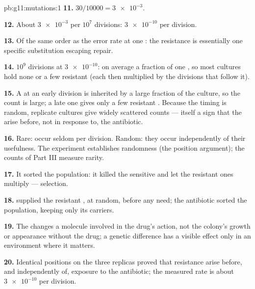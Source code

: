 \begin{solution}{pb:g11:mutations:1}
\textbf{11.} $30/\num{10000} = \num{3e-3}$.

\textbf{12.} About $\num{3e-3}$  per $10^7$ divisions:
$\num{3e-10}$ per division.

\textbf{13.} Of the same order as the error rate at one :
the resistance  is essentially one specific substitution
escaping repair.

\textbf{14.} $10^9$ divisions at $\num{3e-10}$: on average a fraction
of one , so most cultures hold none or a few resistant 
(each  then multiplied by the divisions that follow it).

\textbf{15.} A  at an early division is inherited by a large
fraction of the culture, so the count is large; a late one gives only
a few resistant . Because the timing is random, replicate
cultures give widely scattered counts --- itself a sign that the
 arise before, not in response to, the antibiotic.

\textbf{16.} Rare:  occur seldom per division. Random: they
occur independently of their usefulness. The experiment establishes
randomness (the position argument); the counts of Part III measure
rarity.

\textbf{17.} It sorted the population: it killed the sensitive 
and let the resistant ones multiply --- selection.

\textbf{18.}  supplied the resistant , at random, before
any need; the antibiotic sorted the population, keeping only its
carriers.

\textbf{19.} The  changes a molecule involved in the drug's
action, not the colony's growth or appearance without the drug; a
genetic difference has a visible effect only in an environment where
it matters.

\textbf{20.} Identical positions on the three replicas proved that
resistance  arise before, and independently of, exposure to
the antibiotic; the measured rate is about $\num{3e-10}$ per 
division.
\end{solution}
